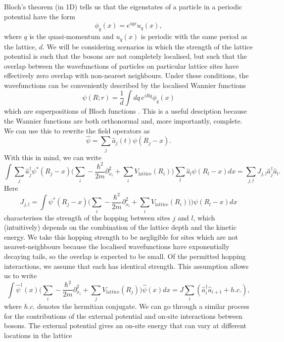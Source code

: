 \documentclass[a4paper,10pt]{article}
\begin{document}
Bloch's theorem (in 1D) \cite{Bloch1929,Kittel1987} tells us that the eigenstates of a particle in a periodic potential have the form
\begin{equation}
 \phi_q(x)=e^{iqx}u_{q}(x),
\end{equation}
where $q$ is the quasi-momentum and $u_q(x)$ is periodic with the same period as the lattice, $d$. We will be considering scenarios in which the strength of the lattice potential
is such that the bosons are not completely localised, but such that the overlap between the wavefunctions of particles on particular lattice sites have effectively zero overlap 
with non-nearest neighbours. Under these conditions, the wavefunctions can be conveniently described by the localised Wannier functions
\begin{equation}
\psi(R;r)=\frac{1}{d}\int dq\, e^{iRq}\phi_q(x)
\end{equation}
which are superpositions of Bloch functions \cite{Kittel1987,Wannier1937}. This is a useful desciption because the Wannier functions are both orthonormal and, more importantly, complete.
We can use this to rewrite the field operators as 
\begin{equation}
 \hat{\psi}=\sum_j \hat{a}_{j}(t)\psi(R_j-x).
\end{equation}
With this in mind, we can write
\begin{equation}
 \int  \sum_j\hat{a}_j^{\dagger}\psi^{*}(R_j-x) \bigg(  \sum_{i}-\frac{\hbar^{2}}{2m}  \partial_{x_{i}}^2+\sum_{i}V_{\text{lattice}}(R_{i}) 
 \bigg)  \sum_l  \hat{a}_l\psi(R_l-x)dx=\sum_{j,l} J_{j,l}\hat{a}_{j}^{\dagger}\hat{a}_l.
\end{equation}
Here
\begin{equation}
 J_{j,l}=\int  \psi^{*}(R_j-x) \bigg(  \sum_{i}-\frac{\hbar^{2}}{2m}  \partial_{x_{i}}^2+\sum_{i}V_{\text{lattice}}(R_{i}))  \bigg)  \psi(R_l-x)dx
\end{equation}
characterises the strength of the hopping between sites $j$ and $l$, which (intuitively) depends on the combination of the lattice depth and the kinetic energy. We take this hopping strength to be negligible
for sites which are not nearest-neighbours because the localised wavefunctions have exponentially decaying tails, so the overlap is expected to be small. Of the permitted hopping interactions, we assume that each has identical strength. This assumption allows us to write
\begin{equation}
 \int  \hat{\psi}^{\dagger}(x) \bigg(  \sum_{i}-\frac{\hbar^{2}}{2m}  \partial_{x_{i}}^2+\sum_{j}V_{\text{lattice}}(R_{j})  \bigg)    \hat{\psi}(x)dx=J\sum_{i}(\hat{a}^\dagger_{i}\hat{a}_{i+1}+h.c.),
\end{equation}
where $h.c.$ denotes the hermitian conjugate.
We can go through a similar process for the contributions of the external potential and on-site interactions between bosons. The external potential gives an on-site energy that can vary
at different locations in the lattice
\end{document}
